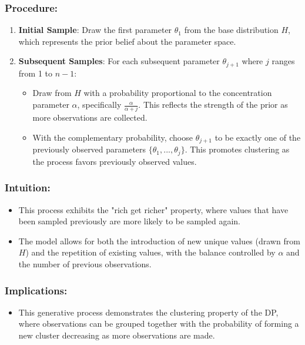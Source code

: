 \documentclass[10pt]{article}
\begin{document}
\subsubsection*{Procedure:}
\begin{enumerate}
  \item \textbf{Initial Sample}: Draw the first parameter \( \theta_1 \) from the base distribution \( H \), which represents the prior belief about the parameter space.
  \item \textbf{Subsequent Samples}: For each subsequent parameter \( \theta_{j+1} \) where \( j \) ranges from 1 to \( n-1 \):
  \begin{itemize}
    \item Draw from \( H \) with a probability proportional to the concentration parameter \( \alpha \), specifically \( \frac{\alpha}{\alpha + j} \). This reflects the strength of the prior as more observations are collected.
    \item With the complementary probability, choose \( \theta_{j+1} \) to be exactly one of the previously observed parameters \( \{\theta_1, ..., \theta_j\} \). This promotes clustering as the process favors previously observed values.
  \end{itemize}
\end{enumerate}

\subsubsection*{Intuition:}
\begin{itemize}
  \item This process exhibits the "rich get richer" property, where values that have been sampled previously are more likely to be sampled again.
  \item The model allows for both the introduction of new unique values (drawn from \( H \)) and the repetition of existing values, with the balance controlled by \( \alpha \) and the number of previous observations.
\end{itemize}

\subsubsection*{Implications:}
\begin{itemize}
  \item This generative process demonstrates the clustering property of the DP, where observations can be grouped together with the probability of forming a new cluster decreasing as more observations are made.
\end{itemize}
\end{document}
